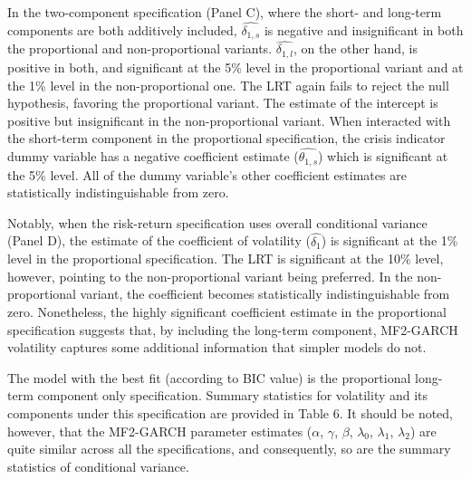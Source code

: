 \documentclass[12pt]{article}
\begin{document}
In the two-component specification (Panel C), where the short- and long-term components are both additively included, $\widehat{\delta_{1,s}}$ is negative and insignificant in both the proportional and non-proportional variants. $\widehat{\delta_{1,l}}$, on the other hand, is positive in both, and significant at the 5\% level in the proportional variant and at the 1\% level in the non-proportional one. The LRT again fails to reject the null hypothesis, favoring the proportional variant. The estimate of the intercept is positive but insignificant in the non-proportional variant. When interacted with the short-term component in the proportional specification, the crisis indicator dummy variable has a negative coefficient estimate ($\widehat{\theta_{1,s}}$) which is significant at the 5\% level. All of the dummy variable's other coefficient estimates are statistically indistinguishable from zero.\par
Notably, when the risk-return specification uses overall conditional variance (Panel D), the estimate of the coefficient of volatility ($\widehat{\delta_1}$) is significant at the 1\% level in the proportional specification. The LRT is significant at the 10\% level, however, pointing to the non-proportional variant being preferred. In the non-proportional variant, the coefficient becomes statistically indistinguishable from zero. Nonetheless, the highly significant coefficient estimate in the proportional specification suggests that, by including the long-term component, MF2-GARCH volatility captures some additional information that simpler models do not.\par
The model with the best fit (according to BIC value) is the proportional long-term component only specification. Summary statistics for volatility and its components under this specification are provided in Table 6. It should be noted, however, that the MF2-GARCH parameter estimates ($\alpha$, $\gamma$, $\beta$, $\lambda_0$, $\lambda_1$, $\lambda_2$) are quite similar across all the specifications, and consequently, so are the summary statistics of conditional variance.
\end{document}
